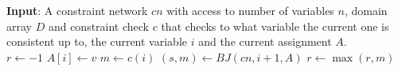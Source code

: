 \State \textbf{Input}: A constraint network $cn$ with access to number of variables $n$, domain array $D$ and constraint check $c$ that checks to what variable the current one is consistent up to, the current variable $i$ and the current assignment $A$.\\
    \State $r \gets -1$
        \State $A[i]\gets v$
        \State $m\gets c(i)$
                \State {} 
            \EndIf
            \State $(s,m)\gets BJ(cn, i+1, A)$
                \State {}
            \EndIf
                \State {}
            \EndIf
        \EndIf
        \State $r \gets \max(r, m)$
    \EndFor
    \State{}
\EndFunction